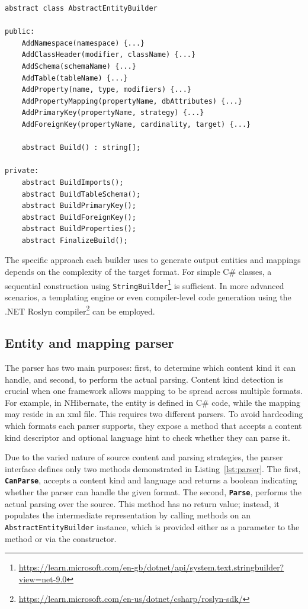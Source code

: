  \begin{lstlisting}[caption={AbstractEntityBuilder class structure}, language=pseudo, label={lst:aeb}]
abstract class AbstractEntityBuilder
    
public: 
    AddNamespace(namespace) {...}
    AddClassHeader(modifier, className) {...}
    AddSchema(schemaName) {...}
    AddTable(tableName) {...}
    AddProperty(name, type, modifiers) {...}
    AddPropertyMapping(propertyName, dbAttributes) {...}
    AddPrimaryKey(propertyName, strategy) {...}
    AddForeignKey(propertyName, cardinality, target) {...}
    
    abstract Build() : string[];

private: 
    abstract BuildImports();
    abstract BuildTableSchema();
    abstract BuildPrimaryKey();
    abstract BuildForeignKey();
    abstract BuildProperties();
    abstract FinalizeBuild();
 \end{lstlisting}

 The specific approach each builder uses to generate output entities and mappings depends on the complexity of the target format. For simple C\# classes, a sequential construction using \texttt{StringBuilder}\footnote{\url{https://learn.microsoft.com/en-gb/dotnet/api/system.text.stringbuilder?view=net-9.0}} is sufficient. In more advanced scenarios, a templating engine or even compiler-level code generation using the .NET Roslyn compiler\footnote{\url{https://learn.microsoft.com/en-us/dotnet/csharp/roslyn-sdk/}} can be employed.

\subsection{Entity and mapping parser}
The parser has two main purposes: first, to determine which content kind it can handle, and second, to perform the actual parsing. Content kind detection is crucial when one framework allows mapping to be spread across multiple formats. For example, in NHibernate, the entity is defined in C\# code, while the mapping may reside in an \acrshort{xml} file. This requires two different parsers. To avoid hardcoding which formats each parser supports, they expose a method that accepts a content kind descriptor and optional language hint to check whether they can parse it.

Due to the varied nature of source content and parsing strategies, the parser interface defines only two methods demonstrated in Listing~\ref{lst:parser}. The first, \texttt{\textbf{CanParse}}, accepts a content kind and language and returns a boolean indicating whether the parser can handle the given format. The second, \texttt{\textbf{Parse}}, performs the actual parsing over the source. This method has no return value; instead, it populates the intermediate representation by calling methods on an \texttt{AbstractEntityBuilder} instance, which is provided either as a parameter to the method or via the constructor.

